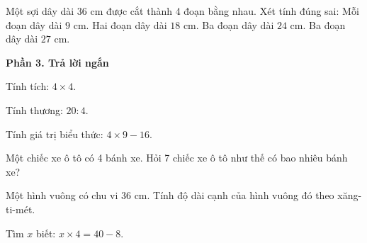 \begin{ex} %
Một sợi dây dài $36\text{ cm}$ được cắt thành 4 đoạn bằng nhau. Xét tính đúng sai:
\choiceTF
{\True Mỗi đoạn dây dài $9\text{ cm}$.}
{\True Hai đoạn dây dài $18\text{ cm}$.}
{Ba đoạn dây dài $24\text{ cm}$.}
{\True Ba đoạn dây dài $27\text{ cm}$.}
\end{ex}

\textbf{Phần 3. Trả lời ngắn}

\begin{ex} %
Tính tích: $4 \times 4$.
\end{ex}

\begin{ex} %
Tính thương: $20 : 4$.
\end{ex}

\begin{ex} %
Tính giá trị biểu thức: $4 \times 9 - 16$.
\end{ex}

\begin{ex} %
Một chiếc xe ô tô có 4 bánh xe. Hỏi 7 chiếc xe ô tô như thế có bao nhiêu bánh xe?
\end{ex}

\begin{ex} %
Một hình vuông có chu vi $36\text{ cm}$. Tính độ dài cạnh của hình vuông đó theo xăng-ti-mét.
\end{ex}

\begin{ex} %
Tìm $x$ biết: $x \times 4 = 40 - 8$.
\end{ex}
